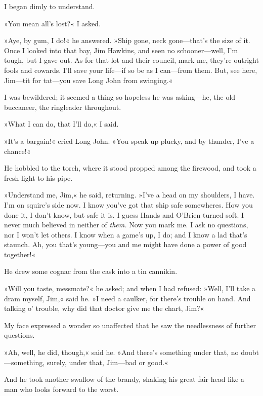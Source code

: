 I began dimly to understand.

»You mean all's lost?« I asked.

»Aye, by gum, I do!« he answered. »Ship gone, neck gone—that's the size of it. Once I looked into that bay, Jim Hawkins, and seen no schooner—well, I'm tough, but I gave out. As for that lot and their council, mark me, they're outright fools and cowards. I'll save your life—if so be as I can—from them. But, see here, Jim—tit for tat—you save Long John from swinging.«

I was bewildered; it seemed a thing so hopeless he was asking—he, the old buccaneer, the ringleader throughout.

»What I can do, that I'll do,« I said.

»It's a bargain!« cried Long John. »You speak up plucky, and by thunder, I've a chance!«

He hobbled to the torch, where it stood propped among the firewood, and took a fresh light to his pipe.

»Understand me, Jim,« he said, returning. »I've a head on my shoulders, I have. I'm on squire's side now. I know you've got that ship safe somewheres. How you done it, I don't know, but safe it is. I guess Hands and O'Brien turned soft. I never much believed in neither of \textit{them.} Now you mark me. I ask no questions, nor I won't let others. I know when a game's up, I do; and I know a lad that's staunch. Ah, you that's young—you and me might have done a power of good together!«

He drew some cognac from the cask into a tin cannikin.

»Will you taste, messmate?« he asked; and when I had refused: »Well, I'll take a dram myself, Jim,« said he. »I need a caulker, for there's trouble on hand. And talking o' trouble, why did that doctor give me the chart, Jim?«

My face expressed a wonder so unaffected that he saw the needlessness of further questions.

»Ah, well, he did, though,« said he. »And there's something under that, no doubt—something, surely, under that, Jim—bad or good.«

And he took another swallow of the brandy, shaking his great fair head like a man who looks forward to the worst.